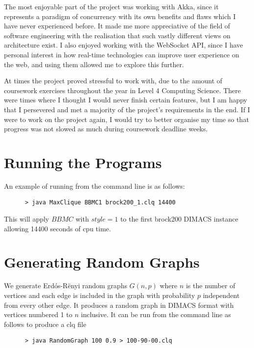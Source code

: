 \documentclass{l4proj}
\begin{document}
    The most enjoyable part of the project was working with Akka, since it represents a paradigm of concurrency with its own benefits and flaws which I have never experienced before. It made me more appreciative of the field of software engineering with the realisation that such vastly different views on architecture exist. I also enjoyed working with the WebSocket API, since I have personal interest in how real-time technologies can improve user experience on the web, and using them allowed me to explore this further.
    
    At times the project proved stressful to work with, due to the amount of coursework exercises throughout the year in Level 4 Computing Science. There were times where I thought I would never finish certain features, but I am happy that I persevered and met a majority of the project's requirements in the end. If I were to work on the project again, I would try to better organise my time so that progress was not slowed as much during coursework deadline weeks.

\begin{appendices}

\chapter{Running the Programs}
An example of running from the command line is as follows:
\begin{verbatim}
      > java MaxClique BBMC1 brock200_1.clq 14400
\end{verbatim}
This will apply $BBMC$ with $style = 1$ to the first brock200 DIMACS instance allowing 14400 seconds of cpu time.

\chapter{Generating Random Graphs}
\label{sec:randomGraph}
We generate Erd\'{o}s-R\"{e}nyi random graphs $G(n,p)$ where $n$ is the number of vertices and
each edge is included in the graph with probability $p$ independent from every other edge. It produces
a random graph in DIMACS format with vertices numbered 1 to $n$ inclusive. It can be run from the command line as follows to produce 
a clq file
\begin{verbatim}
      > java RandomGraph 100 0.9 > 100-90-00.clq
\end{verbatim}
\end{appendices}



\end{document}
